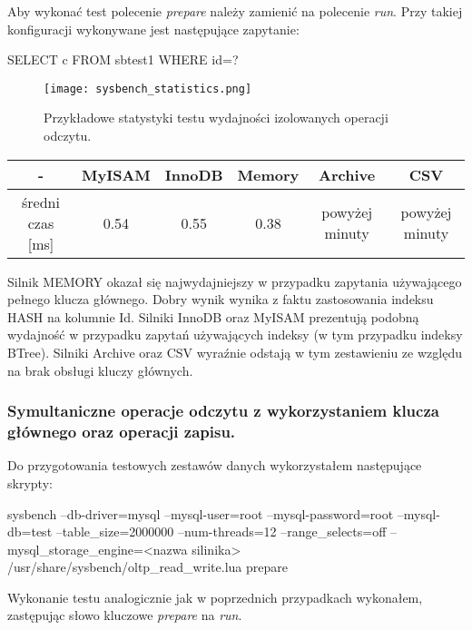 Aby wykonać test polecenie \textit{prepare} należy zamienić na polecenie \textit{run}. Przy takiej konfiguracji wykonywane jest następujące zapytanie:
\begin{spverbatim}
	SELECT c FROM sbtest1 WHERE id=?
\end{spverbatim}
\begin{figure}[H]
	\caption{Przykładowe statystyki testu wydajności izolowanych operacji odczytu.}
	\centering
	\texttt{[image: sysbench\_statistics.png]}
	\label{fig:label}
\end{figure}
\begin{center}
	\begin{tabular}{ | c | c | c | c | c | c |}
		\hline
		- & MyISAM & InnoDB & Memory & Archive & CSV  \\ 
		\hline
		średni czas [ms] & 0.54 & 0.55 & 0.38 & powyżej minuty & powyżej minuty \\
		\hline
	\end{tabular}
\end{center}
Silnik MEMORY okazał się najwydajniejszy w przypadku zapytania używającego pełnego klucza głównego. Dobry wynik wynika z faktu zastosowania indeksu HASH na kolumnie Id. Silniki InnoDB oraz MyISAM prezentują podobną wydajność w przypadku zapytań używających indeksy (w tym przypadku indeksy BTree). Silniki Archive oraz CSV wyraźnie odstają w tym zestawieniu ze względu na brak obsługi kluczy głównych.


\subsubsection{Symultaniczne operacje odczytu z wykorzystaniem klucza głównego oraz operacji zapisu.}

Do przygotowania testowych zestawów danych wykorzystałem następujące skrypty:
\begin{spverbatim}
	sysbench --db-driver=mysql --mysql-user=root --mysql-password=root --mysql-db=test --table_size=2000000 --num-threads=12 --range_selects=off --mysql_storage_engine=<nazwa silinika>  /usr/share/sysbench/oltp_read_write.lua prepare
\end{spverbatim}

Wykonanie testu analogicznie jak w poprzednich przypadkach wykonałem, zastępując słowo kluczowe \textit{prepare} na \textit{run}.

